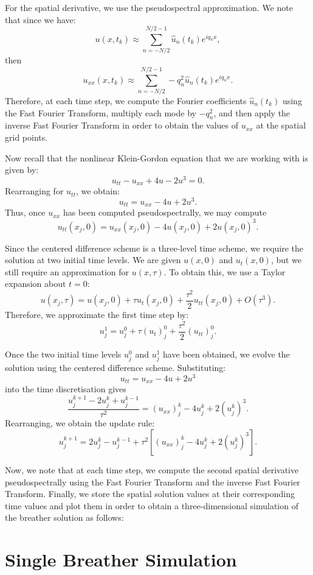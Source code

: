 \documentclass[12pt]{article}
\begin{document}
For the spatial derivative, we use the pseudospectral approximation. We note that since we have: 
\[
u(x,t_k)
\approx
\sum_{n=-N/2}^{N/2-1}
\widehat{u}_n(t_k)e^{iq_n x},
\]
then
\[
u_{xx}(x,t_k)
\approx
\sum_{n=-N/2}^{N/2-1}
-q_n^2 \widehat{u}_n(t_k)e^{iq_n x}.
\]
Therefore, at each time step, we compute the Fourier coefficients \(\widehat{u}_n(t_k)\) using the Fast Fourier Transform, multiply each mode by \(-q_n^2\), and then apply the inverse Fast Fourier Transform in order to obtain the values of \(u_{xx}\) at the spatial grid points.

Now recall that the nonlinear Klein-Gordon equation that we are working with is given by: 
\[
u_{tt} - u_{xx} + 4u - 2u^3 = 0.
\]
Rearranging for \(u_{tt}\), we obtain: 
\[
u_{tt} = u_{xx} - 4u + 2u^3.
\]
Thus, once \(u_{xx}\) has been computed pseudospectrally, we may compute
\[
u_{tt}(x_j,0)
=
u_{xx}(x_j,0) - 4u(x_j,0) + 2u(x_j,0)^3.
\]

Since the centered difference scheme is a three-level time scheme, we require the solution at two initial time levels. We are given \(u(x,0)\) and \(u_t(x,0)\), but we still require an approximation for \(u(x,\tau)\). To obtain this, we use a Taylor expansion about \(t=0\):
\[
u(x_j,\tau)
=
u(x_j,0)
+
\tau u_t(x_j,0)
+
\frac{\tau^2}{2}u_{tt}(x_j,0)
+
O(\tau^3).
\]
Therefore, we approximate the first time step by:
\[
u_j^1
=
u_j^0
+
\tau (u_t)_j^0
+
\frac{\tau^2}{2}(u_{tt})_j^0.
\]

Once the two initial time levels \(u_j^0\) and \(u_j^1\) have been obtained, we evolve the solution using the centered difference scheme. Substituting:
\[
u_{tt} = u_{xx} - 4u + 2u^3
\]
into the time discretisation gives
\[
\frac{u_j^{k+1} - 2u_j^k + u_j^{k-1}}{\tau^2}
=
(u_{xx})_j^k - 4u_j^k + 2(u_j^k)^3.
\]
Rearranging, we obtain the update rule: 
\[
u_j^{k+1}
=
2u_j^k - u_j^{k-1}
+
\tau^2
\left[
(u_{xx})_j^k - 4u_j^k + 2(u_j^k)^3
\right].
\]

Now, we note that at each time step, we compute the second spatial derivative pseudospectrally using the Fast Fourier Transform and the inverse Fast Fourier Transform. Finally, we store the spatial solution values at their corresponding time values and plot them in order to obtain a three-dimensional simulation of the breather solution as follows: 

\section*{Single Breather Simulation}
\end{document}
